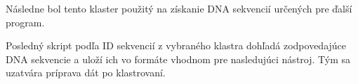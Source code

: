 Následne bol tento klaster použitý na získanie DNA sekvencií určených pre ďalší program.

Posledný skript podľa ID sekvencií z vybraného klastra dohľadá zodpovedajúce DNA sekvencie a uloží ich vo formáte vhodnom pre nasledujúci nástroj. Tým sa uzatvára príprava dát po klastrovaní.
